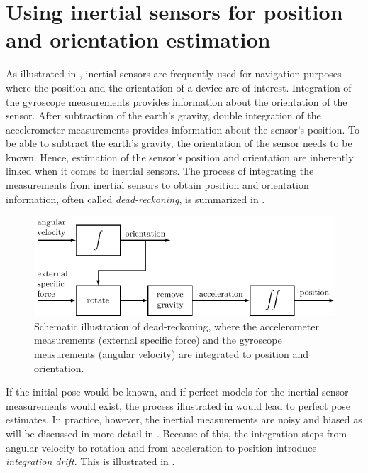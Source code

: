 \section{Using inertial sensors for position and orientation estimation}
\label{sec:intro-imusForPose}
As illustrated in , inertial sensors are frequently used for navigation purposes where the position and the orientation of a device are of interest. Integration of the gyroscope measurements provides information about the orientation of the sensor. After subtraction of the earth's gravity, double integration of the accelerometer measurements provides information about the sensor's position. To be able to subtract the earth's gravity, the orientation of the sensor needs to be known. Hence, estimation of the sensor's position and orientation are inherently linked when it comes to inertial sensors. The process of integrating the measurements from inertial sensors to obtain position and orientation information, often called \emph{dead-reckoning}, is summarized in .

\begin{figure}
	\centering
	\includegraphics[scale = 1]{figure1_4.pdf}
		\caption{Schematic illustration of dead-reckoning, where the accelerometer measurements (external specific force) and the gyroscope measurements (angular velocity) are integrated to position and orientation.}
	\label{fig:intro-strapdown}
\end{figure}

If the initial pose would be known, and if perfect models for the inertial sensor measurements would exist, the process illustrated in  would lead to perfect pose estimates. In practice, however, the inertial measurements are noisy and biased as will be discussed in more detail in . Because of this, the integration steps from angular velocity to rotation and from acceleration to position introduce \textit{integration drift}. This is illustrated in . 

